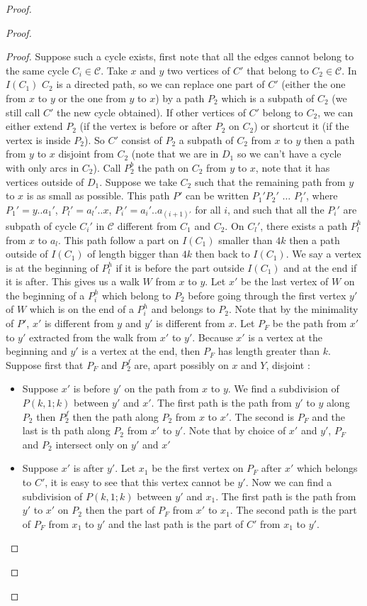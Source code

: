 \documentclass[10pt]{article}
\theoremstyle{plain}
\theoremstyle{definition}
\theoremstyle{remark}
\begin{document}
\begin{proof}
\begin{proof}
\begin{proof}
Suppose such a cycle exists, first note that all the edges cannot belong to the same cycle $C_i \in \mathcal{C}$.
Take $x$ and $y$ two vertices of $C'$ that belong to $C_2 \in \mathcal{C}$. In $I(C_1)$ $C_2$ is a directed path, 
so we can replace one part of $C'$ (either the one from $x$ to $y$ or the one from $y$ to $x$) by a path $P_2$ which is a subpath of $C_2$ (we still call 
$C'$ the new cycle obtained). If other vertices of $C'$ belong to $C_2$, we can either extend 
$P_2$ (if the vertex is before or after $P_2$ on $C_2$)
or shortcut it (if the vertex is inside $P_2$). So $C'$ consist of $P_2$ a subpath of 
$C_2$ from $x$ to $y$ then a path from $y$ to $x$ disjoint from $C_2$ 
(note that we are in $D_1$ so we can't have a cycle with only arcs in $C_2$).
Call $P_2^b$ the path on $C_2$ from $y$ to $x$, note that it has vertices outside of $D_1$. 
Suppose we take $C_2$ such that the remaining path from $y$ to $x$ is as small as possible. 
This path $P'$ can be written $P_1'P_2'$ $\dots$ $P_l'$, where $P_1' = y..a_1'$, 
$P_l' = a_l' ..x$, $P_i' = a_i'..a_{(i+1)'}$ for all $i$, and such that all 
the $P_i'$ are subpath of cycle $C_i'$ in $\mathcal{C}$ different from $C_1$ and $C_2$. 
On $C_l'$, there exists a path $P_l^h$ from $x$ to $a_l$. This path follow a part
on $I(C_1)$ smaller than $4k$ then a path outside of $I(C_1)$ of length bigger than 
$4k$ then back to $I(C_1)$. We say a vertex is at the beginning of $P_l^h$ if it is 
before the part outside $I(C_1)$ and at the end if it is after.
This gives us a walk $W$ from $x$ to $y$. Let $x'$ be the last vertex of $W$ on the beginning of a 
$P_i^h$ which belong to $P_2$ before going through the first vertex $y'$ of $W$ which is on the 
end of a $P_i^h$ and belongs to $P_2$. Note that by the minimality of $P'$, $x'$ is different from $y$ 
and $y'$ is different from $x$.
Let $P_F$ be the path from $x'$ to $y'$ extracted from the walk from
$x'$ to $y'$. Because $x'$ is a vertex at the beginning and $y'$ is a vertex at the end, 
then $P_F$ has length greater than $k$. Suppose first that $P_F$ and $P_2^f$ are, apart possibly on 
$x$ and $Y$, disjoint :

\begin{itemize}
	\item Suppose $x'$ is before $y'$ on the path from $x$ to $y$. We find a subdivision of $P(k,1;k)$ between $y'$ and $x'$.
	The first path is the path from $y'$ to $y$ along $P_2$ then $P_2^f$ then the path along $P_2$ from $x$ to $x'$. The second 
	is $P_F$ and the last is th path along $P_2$ from $x'$ to $y'$. Note that by choice of $x'$ and $y'$, $P_F$ and $P_2$ intersect
	only on $y'$ and $x'$
	\item Suppose $x'$ is after $y'$. Let $x_1$ be the first vertex on $P_F$ after $x'$ which belongs to $C'$, it is easy to see that
	this vertex cannot be $y'$. Now we can find a subdivision of $P(k,1;k)$ between $y'$ and $x_1$. The first path is the path from $y'$
	to $x'$ on $P_2$ then the part of $P_F$ from $x'$ to $x_1$. The second path is the part of $P_F$ from $x_1$ to $y'$ and the last path is
	the part of $C'$ from $x_1$ to $y'$.
\end{itemize}


\end{proof}
\end{proof}
\end{proof}
\end{document}
